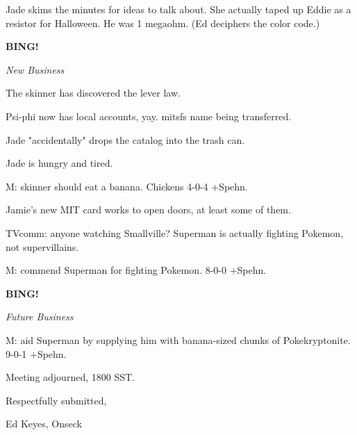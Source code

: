 \documentclass[12pt]{article}
\newcommand{\bing}{{\bf BING!} }
\newcommand{\goto}[1]{\bing \vskip 12pt \centerline{{\em{#1}}}}
\begin{document}
Jade skims the minutes for ideas to talk about. She actually taped up Eddie as a resistor for Halloween. He was 1 megaohm. (Ed deciphers the color code.)

\goto{New Business}

The skinner has discovered the lever law.

Psi-phi now has local accounts, yay. mitsfs name being transferred.

Jade "accidentally" drops the catalog into the trash can.

Jade is hungry and tired.

M: skinner should eat a banana. Chickens 4-0-4 +Spehn.

Jamie's new MIT card works to open doors, at least some of them.

TVcomm: anyone watching Smallville? Superman is actually fighting Pokemon, not supervillains.

M: commend Superman for fighting Pokemon. 8-0-0 +Spehn.

\goto{Future Business}

M: aid Superman by supplying him with banana-sized chunks of Pokekryptonite. 9-0-1 +Spehn.

\vspace{12pt}

\noindent
Meeting adjourned, 1800 SST.

\vspace{18pt}

\centerline{Respectfully submitted,}
\centerline{Ed Keyes, Onseck}
\end{document}
